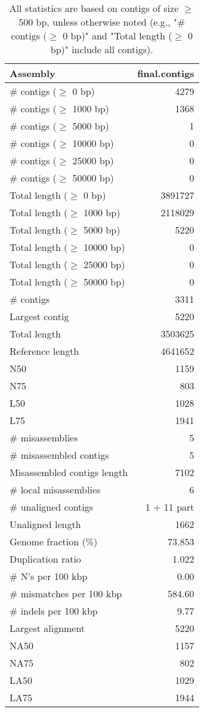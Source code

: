 \documentclass[12pt,a4paper]{article}
\begin{document}
\begin{table}[ht]
\begin{center}
\caption{All statistics are based on contigs of size $\geq$ 500 bp, unless otherwise noted (e.g., "\# contigs ($\geq$ 0 bp)" and "Total length ($\geq$ 0 bp)" include all contigs).}
\begin{tabular}{|l*{1}{|r}|}
\hline
Assembly & final.contigs \\ \hline
\# contigs ($\geq$ 0 bp) & 4279 \\ \hline
\# contigs ($\geq$ 1000 bp) & 1368 \\ \hline
\# contigs ($\geq$ 5000 bp) & 1 \\ \hline
\# contigs ($\geq$ 10000 bp) & 0 \\ \hline
\# contigs ($\geq$ 25000 bp) & 0 \\ \hline
\# contigs ($\geq$ 50000 bp) & 0 \\ \hline
Total length ($\geq$ 0 bp) & 3891727 \\ \hline
Total length ($\geq$ 1000 bp) & 2118029 \\ \hline
Total length ($\geq$ 5000 bp) & 5220 \\ \hline
Total length ($\geq$ 10000 bp) & 0 \\ \hline
Total length ($\geq$ 25000 bp) & 0 \\ \hline
Total length ($\geq$ 50000 bp) & 0 \\ \hline
\# contigs & 3311 \\ \hline
Largest contig & 5220 \\ \hline
Total length & 3503625 \\ \hline
Reference length & 4641652 \\ \hline
N50 & 1159 \\ \hline
N75 & 803 \\ \hline
L50 & 1028 \\ \hline
L75 & 1941 \\ \hline
\# misassemblies & 5 \\ \hline
\# misassembled contigs & 5 \\ \hline
Misassembled contigs length & 7102 \\ \hline
\# local misassemblies & 6 \\ \hline
\# unaligned contigs & 1 + 11 part \\ \hline
Unaligned length & 1662 \\ \hline
Genome fraction (\%) & 73.853 \\ \hline
Duplication ratio & 1.022 \\ \hline
\# N's per 100 kbp & 0.00 \\ \hline
\# mismatches per 100 kbp & 584.60 \\ \hline
\# indels per 100 kbp & 9.77 \\ \hline
Largest alignment & 5220 \\ \hline
NA50 & 1157 \\ \hline
NA75 & 802 \\ \hline
LA50 & 1029 \\ \hline
LA75 & 1944 \\ \hline
\end{tabular}
\end{center}
\end{table}
\end{document}
